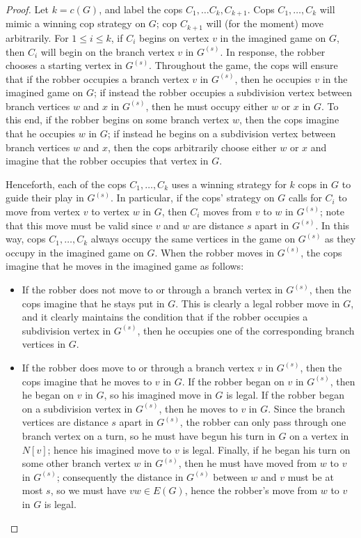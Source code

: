 \documentclass[10pt,a4paper]{amsart}
\begin{document}
\begin{proof}
    Let $k=c(G)$, and label the cops $C_1, \dots C_k, C_{k+1}$.  Cops $C_1, \dots, C_k$ will mimic a winning cop strategy on $G$; cop $C_{k+1}$ will (for the moment) move arbitrarily.  For $1 \le i \le k$, if $C_i$ begins on vertex $v$ in the imagined game on $G$, then $C_i$ will begin on the branch vertex $v$ in $G^{(s)}$.  In response, the robber chooses a starting vertex in $G^{(s)}$.  Throughout the game, the cops will ensure that if the robber occupies a branch vertex $v$ in $G^{(s)}$, then he occupies $v$ in the imagined game on $G$; if instead the robber occupies a subdivision vertex between branch vertices $w$ and $x$ in $G^{(s)}$, then he must occupy either $w$ or $x$ in $G$.  To this end, if the robber begins on some branch vertex $w$, then the cops imagine that he occupies $w$ in $G$; if instead he begins on a subdivision vertex between branch vertices $w$ and $x$, then the cops arbitrarily choose either $w$ or $x$ and imagine that the robber occupies that vertex in $G$.

    Henceforth, each of the cops $C_1, \dots, C_k$ uses a winning strategy for $k$ cops in $G$ to guide their play in $G^{(s)}$.  In particular, if the cops' strategy on $G$ calls for $C_i$ to move from vertex $v$ to vertex $w$ in $G$, then $C_i$ moves from $v$ to $w$ in $G^{(s)}$; note that this move must be valid since $v$ and $w$ are distance $s$ apart in $G^{(s)}$.  In this way, cops $C_1, \dots, C_k$ always occupy the same vertices in the game on $G^{(s)}$ as they occupy in the imagined game on $G$.  When the robber moves in $G^{(s)}$, the cops imagine that he moves in the imagined game as follows:
    \begin{itemize}
    \item If the robber does not move to or through a branch vertex in $G^{(s)}$, then the cops imagine that he stays put in $G$.  This is clearly a legal robber move in $G$, and it clearly maintains the condition that if the robber occupies a subdivision vertex in $G^{(s)}$, then he occupies one of the corresponding branch vertices in $G$. 
    
    \item If the robber does move to or through a branch vertex $v$ in $G^{(s)}$, then the cops imagine that he moves to $v$ in $G$.  If the robber began on $v$ in $G^{(s)}$, then he began on $v$ in $G$, so his imagined move in $G$ is legal.  If the robber began on a subdivision vertex in $G^{(s)}$, then he moves to $v$ in $G$.  Since the branch vertices are distance $s$ apart in $G^{(s)}$, the robber can only pass through one branch vertex on a turn, so he must have begun his turn in $G$ on a vertex in $N[v]$; hence his imagined move to $v$ is legal.  Finally, if he began his turn on some other branch vertex $w$ in $G^{(s)}$, then he must have moved from $w$ to $v$ in $G^{(s)}$; consequently the distance in $G^{(s)}$ between $w$ and $v$ must be at most $s$, so we must have $vw \in E(G)$, hence the robber's move from $w$ to $v$ in $G$ is legal.  
    \end{itemize}
    

\end{proof}
\end{document}
